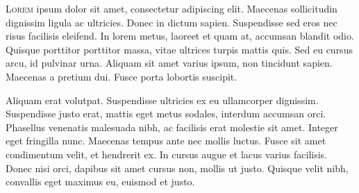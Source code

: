 \documentclass[]{article}
\date{}
\begin{document}
\lettrine[lines=2]{L}{orem} ipsum dolor sit amet, consectetur adipiscing
elit. Maecenas sollicitudin dignissim ligula ac ultricies. Donec in
dictum sapien. Suspendisse sed eros nec risus facilisis eleifend. In
lorem metus, laoreet et quam at, accumsan blandit odio. Quisque
porttitor porttitor massa, vitae ultrices turpis mattis quis. Sed eu
cursus arcu, id pulvinar urna. Aliquam sit amet varius ipsum, non
tincidunt sapien. Maecenas a pretium dui. Fusce porta lobortis suscipit.

Aliquam erat volutpat. Suspendisse ultricies ex eu ullamcorper
dignissim. Suspendisse justo erat, mattis eget metus sodales, interdum
accumsan orci. Phasellus venenatis malesuada nibh, ac facilisis erat
molestie sit amet. Integer eget fringilla nunc. Maecenas tempus ante nec
mollis luctus. Fusce sit amet condimentum velit, et hendrerit ex. In
cursus augue et lacus varius facilisis. Donec nisi orci, dapibus sit
amet cursus non, mollis ut justo. Quisque velit nibh, convallis eget
maximus eu, euismod et justo.
\end{document}
